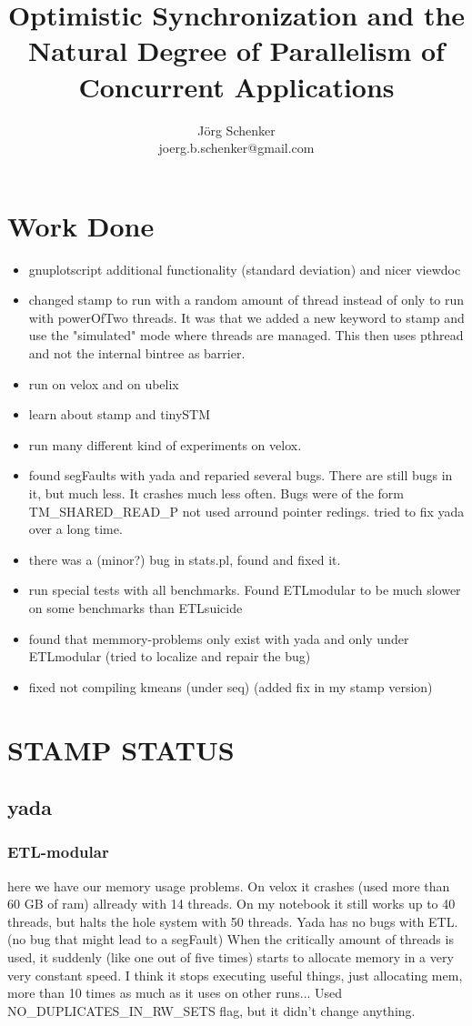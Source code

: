\documentclass[a4paper,10pt]{report}
\title{Optimistic Synchronization and the Natural Degree of Parallelism of Concurrent Applications}
\author{Jörg Schenker\\joerg.b.schenker@gmail.com}
\begin{document}
\maketitle

\begin{abstract}

\end{abstract}
\chapter{Work Done}
\begin{itemize}
\item gnuplotscript additional functionality (standard deviation) and nicer viewdoc
\item changed stamp to run with a random amount of thread instead of only to run with powerOfTwo threads.
It was that we added a new keyword to stamp and use the "simulated" mode where threads are managed.
This then uses pthread and not the internal bintree as barrier.
\item run on velox and on ubelix
\item learn about stamp and tinySTM
\item run many different kind of experiments on velox.
\item found segFaults with yada and reparied several bugs. There are still bugs in it, but much less. It crashes much less often.
Bugs were of the form TM\_SHARED\_READ\_P not used arround pointer redings. tried to fix yada over a long time.
\item there was a (minor?) bug in stats.pl, found and fixed it.
\item run special tests with all benchmarks. Found ETLmodular to be much slower on some benchmarks than ETLsuicide
\item found that memmory-problems only exist with yada and only under ETLmodular (tried to localize and repair the bug)
\item fixed not compiling kmeans (under seq) (added fix in my stamp version)

\end{itemize}
\chapter{STAMP STATUS}
\section{yada}
\subsection{ETL-modular}
here we have our memory usage problems. On velox it crashes (used more than 60 GB of ram) allready with 14 threads.
On my notebook it still works up to 40 threads, but halts the hole system with 50 threads.
Yada has no bugs with ETL. (no bug that might lead to a segFault)
When the critically amount of threads is used, it suddenly (like one out of five times) starts to allocate memory in a very very constant speed.
I think it stops executing useful things, just allocating mem, more than 10 times as much as it uses on other runs...
Used NO\_DUPLICATES\_IN\_RW\_SETS flag, but it didn't change anything.
\end{document}
